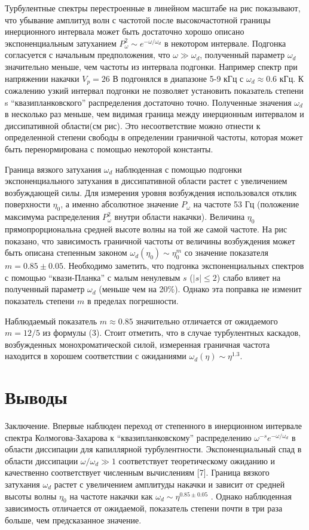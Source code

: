 	Турбулентные спектры перестроенные в линейном масштабе на рис показывают, что убывание амплитуд волн с частотой после высокочастотной границы инерционного интервала может быть достаточно хорошо описано экспоненциальным затуханием $P_\omega^2 \sim	e^{-\omega/\omega_d}$ в некотором интервале. Подгонка согласуется с начальным предположения, что $\omega \gg \omega_d$, полученный параметр $\omega_d$ значительно меньше, чем частоты из интервала подгонки. Например спектр при напряжении накачки $V_p = 26$ В подгонялся в диапазоне 5-9 кГц с $\omega_d \approx 0.6$ кГц. К сожалению узкий интервал подгонки не позволяет установить показатель степени s “квазипланковского” распределения достаточно точно. Полученные значения $\omega_d$ в несколько раз меньше, чем видимая граница между инерционным интервалом и диссипативной области(см рис). Это несоответствие можно отнести к определенной степени свободы в определении граничной частоты, которая может быть перенормирована с помощью некоторой константы.

	Граница вязкого затухания $\omega_d$ наблюденная с помощью подгонки экспоненциального затухания в диссипативной области растет с увеличением возбуждающей силы. Для измерения уровня возбуждения использовался отклик поверхности $\eta_0$, а именно абсолютное значение $P_\omega$ на частоте 53 Гц (положение максимума распределения $P_\omega^2$ внутри области накачки). Величина $\eta_0$ прямопрорциональна средней высоте волны на той же самой частоте. На рис показано, что зависимость граничной частоты от величины возбуждения может быть описана степенным законом $\omega_d(\eta_0) \sim	\eta_0^m$ со значение показателя $m = 0.85 \pm 0.05$. Необходимо заметить, что подгонка экспоненциальных спектров с помощью “квази-Планка” с малым ненулевым $s$ ($|s| \le 2$) слабо влияет на полученный параметр $\omega_d$ (меньше чем на 20\%). Однако эта поправка не изменит показатель степени $m$ в пределах погрешности.

	Наблюдаемый показатель $m \approx 0.85$ значительно отличается от ожидаемого $m = 12/5$ из формулы (3). Стоит отметить, что в случае турбулентных каскадов, возбужденных монохроматической силой, измеренная граничная частота находится в хорошем соответствии с ожиданиями $\omega_d(\eta) \sim \eta^{1.3}$.

\section{Выводы} %
 	Заключение. Впервые наблюден переход от степенного в инерционном интервале спектра Колмогова-Захарова к “квазипланковскому” распределению $\omega^{-s}e^{-\omega/\omega_d}$ в области диссипации для капиллярной турбулентности. Экспоненциальный спад в области диссипации $\omega/\omega_d \gg 1$ соответствует теоретическому ожиданию и качественно соответствует численным вычислениям [7]. Граница вязкого затухания $\omega_d$ растет с увеличением амплитуды накачки и зависит от средней высоты волны $\eta_0$ на частоте накачки как $\omega_d \sim \eta^{0.85 \pm 0.05}$	. Однако наблюденная зависимость отличается от ожидаемой, показатель степени почти в три раза больше, чем предсказанное значение.


\clearpage